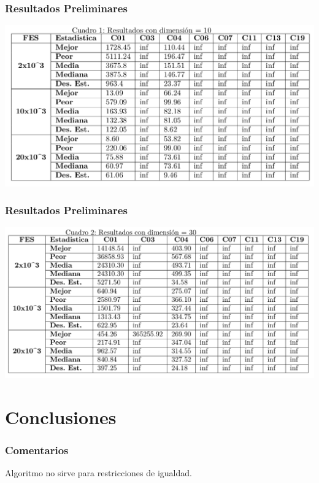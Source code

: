 \documentclass[10pt, compress]{beamer}
\begin{document}
\begin{frame}[fragile]
  \frametitle{Resultados Preliminares}
    \begin{center}
         \includegraphics[scale=0.25]{10dim.png}
    \end{center}{}
\end{frame}

\begin{frame}[fragile]
  \frametitle{Resultados Preliminares}
    \begin{center}
         \includegraphics[scale=0.25]{30dim.png}
    \end{center}{}
\end{frame}

\section{Conclusiones}

\begin{frame}[fragile]
  \frametitle{Comentarios}
    \begin{center}
         Algoritmo no sirve para restricciones de igualdad.
    \end{center}{}
\end{frame}
\end{document}
